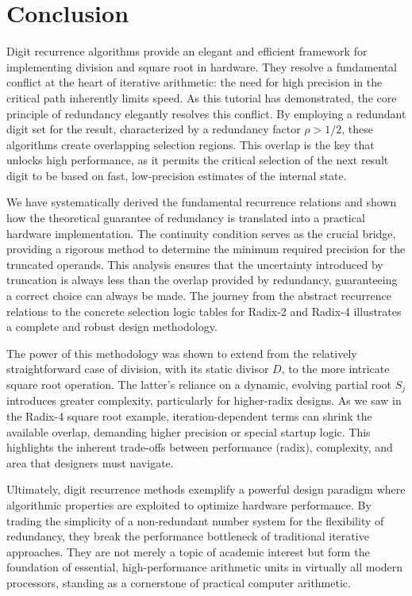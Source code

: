 \documentclass{article}
\begin{document}
\section{Conclusion}
\label{sec:conclusion}
Digit recurrence algorithms provide an elegant and efficient framework for implementing division and square root in hardware.
They resolve a fundamental conflict at the heart of iterative arithmetic: the need for high precision in the critical path inherently limits speed.
As this tutorial has demonstrated, the core principle of redundancy elegantly resolves this conflict.
By employing a redundant digit set for the result, characterized by a redundancy factor $\rho > 1/2$, these algorithms create overlapping selection regions.
This overlap is the key that unlocks high performance, as it permits the critical selection of the next result digit to be based on fast, low-precision estimates of the internal state.

We have systematically derived the fundamental recurrence relations and shown how the theoretical guarantee of redundancy is translated into a practical hardware implementation.
The continuity condition serves as the crucial bridge, providing a rigorous method to determine the minimum required precision for the truncated operands.
This analysis ensures that the uncertainty introduced by truncation is always less than the overlap provided by redundancy, guaranteeing a correct choice can always be made.
The journey from the abstract recurrence relations to the concrete selection logic tables for Radix-2 and Radix-4 illustrates a complete and robust design methodology.

The power of this methodology was shown to extend from the relatively straightforward case of division, with its static divisor $D$, to the more intricate square root operation.
The latter's reliance on a dynamic, evolving partial root $S_j$ introduces greater complexity, particularly for higher-radix designs.
As we saw in the Radix-4 square root example, iteration-dependent terms can shrink the available overlap, demanding higher precision or special startup logic.
This highlights the inherent trade-offs between performance (radix), complexity, and area that designers must navigate.

Ultimately, digit recurrence methods exemplify a powerful design paradigm where algorithmic properties are exploited to optimize hardware performance.
By trading the simplicity of a non-redundant number system for the flexibility of redundancy, they break the performance bottleneck of traditional iterative approaches.
They are not merely a topic of academic interest but form the foundation of essential, high-performance arithmetic units in virtually all modern processors, standing as a cornerstone of practical computer arithmetic.
\end{document}

